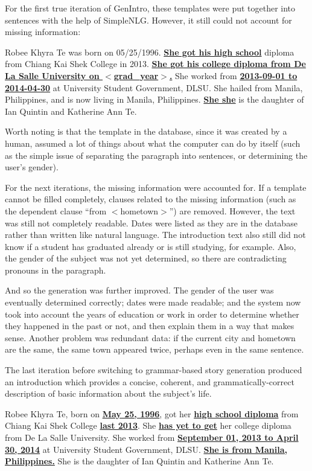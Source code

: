 For the first true iteration of GenIntro, these templates were put together into sentences with the help of SimpleNLG. However, it still could not account for missing information:

\begin{center} Robee Khyra Te was born on 05/25/1996. \underline{\textbf{She got his high school}} diploma from Chiang Kai Shek College in 2013. \underline{\textbf{She got his college diploma from De La Salle University on $<$grad\_year$>$.}} She worked from \underline{\textbf{2013-09-01 to 2014-04-30}} at University Student Government, DLSU. She hailed from Manila, Philippines, and is now living in Manila, Philippines. \underline{\textbf{She she}} is the daughter of Ian Quintin and Katherine Ann Te.
 \end{center}

Worth noting is that the template in the database, since it was created by a human, assumed a lot of things about what the computer can do by itself (such as the simple issue of separating the paragraph into sentences, or determining the user’s gender). 

For the next iterations, the missing information were accounted for. If a template cannot be filled completely, clauses related to the missing information (such as the dependent clause ``from $<$hometown$>$”) are removed. However, the text was still not completely readable. Dates were listed as they are in the database rather than written like natural language. The introduction text also still did not know if a student has graduated already or is still studying, for example. Also, the gender of the subject was not yet determined, so there are contradicting pronouns in the paragraph.

And so the generation was further improved. The gender of the user was eventually  determined correctly; dates were made readable; and the system now took into account the years of education or work in order to determine whether they happened in the past or not, and then explain them in a way that makes sense. Another problem was redundant data: if the current city and hometown are the same, the same town appeared twice, perhaps even in the same sentence.

The last iteration before switching to grammar-based story generation produced an introduction which provides a concise, coherent, and grammatically-correct description of basic information about the subject’s life.

\begin{center} Robee Khyra Te, born on \underline{\textbf{May 25, 1996}}, got her \underline{\textbf{high school diploma}} from Chiang Kai Shek College \underline{\textbf{last 2013}}. She \underline{\textbf{has yet to get}} her college diploma from De La Salle University. She worked from \underline{\textbf{September 01, 2013 to April 30, 2014}} at University Student Government, DLSU. \underline{\textbf{She is from Manila, Philippines.}} She is the daughter of Ian Quintin and Katherine Ann Te. \end{center}

